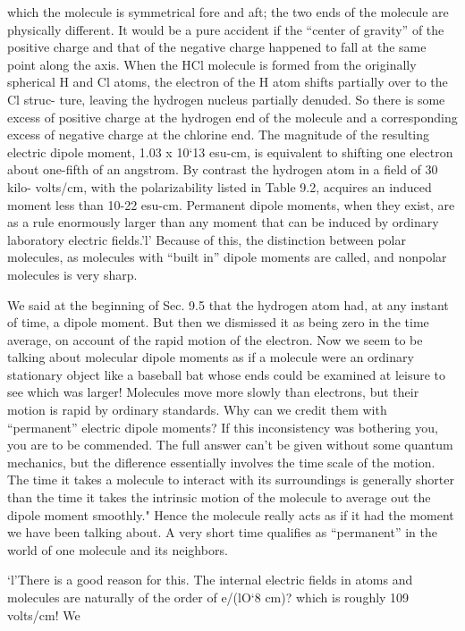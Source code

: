 {%
which the molecule is symmetrical fore and aft; the two ends of the
molecule are physically different. It would be a pure accident if the
``center of gravity'' of the positive charge and that of the negative
charge happened to fall at the same point along the axis. When
the HCl molecule is formed from the originally spherical H and Cl
atoms, the electron of the H atom shifts partially over to the Cl struc-
ture, leaving the hydrogen nucleus partially denuded. So there is
some excess of positive charge at the hydrogen end of the molecule
and a corresponding excess of negative charge at the chlorine end.
The magnitude of the resulting electric dipole moment, 1.03 x 10‘13
esu-cm, is equivalent to shifting one electron about one-fifth of an
angstrom. By contrast the hydrogen atom in a field of 30 kilo-
volts/cm, with the polarizability listed in Table 9.2, acquires an induced
moment less than 10-22 esu-cm. Permanent dipole moments,
when they exist, are as a rule enormously larger than any moment
that can be induced by ordinary laboratory electric fields.'l' Because
of this, the distinction between polar molecules, as molecules with
``built in'' dipole moments are called, and nonpolar molecules is very
sharp.

We said at the beginning of Sec. 9.5 that the hydrogen atom had,
at any instant of time, a dipole moment. But then we dismissed it
as being zero in the time average, on account of the rapid motion of
the electron. Now we seem to be talking about molecular dipole
moments as if a molecule were an ordinary stationary object like a
baseball bat whose ends could be examined at leisure to see which
was larger! Molecules move more slowly than electrons, but their
motion is rapid by ordinary standards. Why can we credit them with
``permanent'' electric dipole moments? If this inconsistency was
bothering you, you are to be commended. The full answer can't be
given without some quantum mechanics, but the diflerence essentially
involves the time scale of the motion. The time it takes a molecule
to interact with its surroundings is generally shorter than the
time it takes the intrinsic motion of the molecule to average out the
dipole moment smoothly." Hence the molecule really acts as if it had
the moment we have been talking about. A very short time qualifies
as ``permanent'' in the world of one molecule and its neighbors.

‘l'There is a good reason for this. The internal electric fields in atoms and molecules
are naturally of the order of e/(lO‘8 cm)? which is roughly 109 volts/cm! We

}
